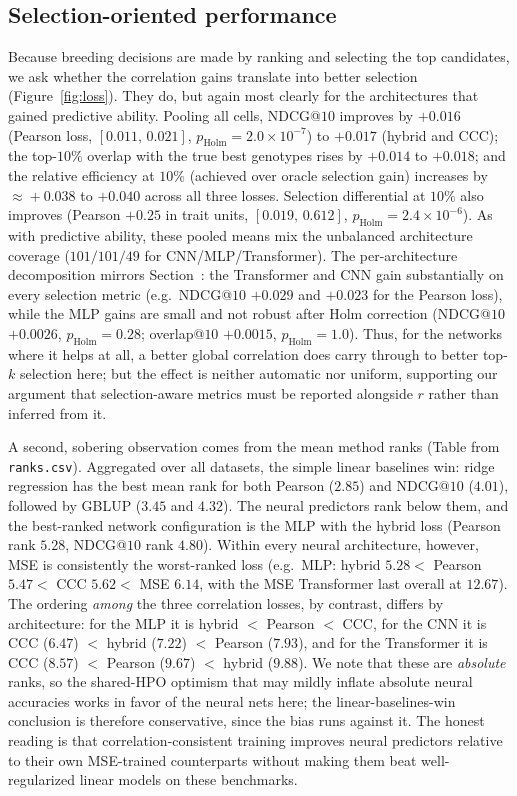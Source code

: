 \subsection{Selection-oriented performance}\label{sec:res-selection}
Because breeding decisions are made by ranking and selecting the top candidates,
we ask whether the correlation gains translate into better selection
(Figure~\ref{fig:loss}). They do, but again most clearly for the architectures
that gained predictive ability. Pooling all cells, NDCG@$10$ improves by $+0.016$
(Pearson loss, $[0.011,\,0.021]$, $p_{\mathrm{Holm}}=2.0\times10^{-7}$) to
$+0.017$ (hybrid and CCC); the top-$10\%$ overlap with the true best genotypes
rises by $+0.014$ to $+0.018$; and the relative efficiency at $10\%$ (achieved
over oracle selection gain) increases by $\approx\!+0.038$ to $+0.040$ across all
three losses. Selection differential at $10\%$ also improves (Pearson $+0.25$ in
trait units, $[0.019,\,0.612]$, $p_{\mathrm{Holm}}=2.4\times10^{-6}$). As with
predictive ability, these pooled means mix the unbalanced architecture coverage
($101/101/49$ for CNN/MLP/Transformer). The per-architecture decomposition
mirrors Section~: the Transformer and CNN gain substantially on
every selection metric (e.g.\ NDCG@$10$ $+0.029$ and $+0.023$ for the Pearson
loss), while the MLP gains are small and not robust after Holm correction
(NDCG@$10$ $+0.0026$, $p_{\mathrm{Holm}}=0.28$; overlap@$10$ $+0.0015$,
$p_{\mathrm{Holm}}=1.0$). Thus, for the networks where it helps at all, a better
global correlation does carry through to better top-$k$ selection here; but the
effect is neither automatic nor uniform, supporting our argument that
selection-aware metrics must be reported alongside $r$ rather than inferred from
it.

A second, sobering observation comes from the mean method ranks (Table from
\texttt{ranks.csv}). Aggregated over all datasets, the simple linear baselines
win: ridge regression has the best mean rank for both Pearson ($2.85$) and
NDCG@$10$ ($4.01$), followed by GBLUP ($3.45$ and $4.32$). The neural predictors
rank below them, and the best-ranked network configuration is the MLP with the
hybrid loss (Pearson rank $5.28$, NDCG@$10$ rank $4.80$). Within every neural
architecture, however, MSE is consistently the worst-ranked loss (e.g.\ MLP:
hybrid $5.28 <$ Pearson $5.47 <$ CCC $5.62 <$ MSE $6.14$, with the MSE
Transformer last overall at $12.67$). The ordering \emph{among} the three
correlation losses, by contrast, differs by architecture: for the MLP it is
hybrid $<$ Pearson $<$ CCC, for the CNN it is CCC ($6.47$) $<$ hybrid ($7.22$)
$<$ Pearson ($7.93$), and for the Transformer it is CCC ($8.57$) $<$ Pearson
($9.67$) $<$ hybrid ($9.88$). We note that these are \emph{absolute} ranks, so the shared-HPO
optimism that may mildly inflate absolute neural accuracies works in favor of the
neural nets here; the linear-baselines-win conclusion is therefore conservative,
since the bias runs against it. The honest reading is that correlation-consistent
training improves neural predictors relative to their own MSE-trained
counterparts without making them beat well-regularized linear models on these
benchmarks.

